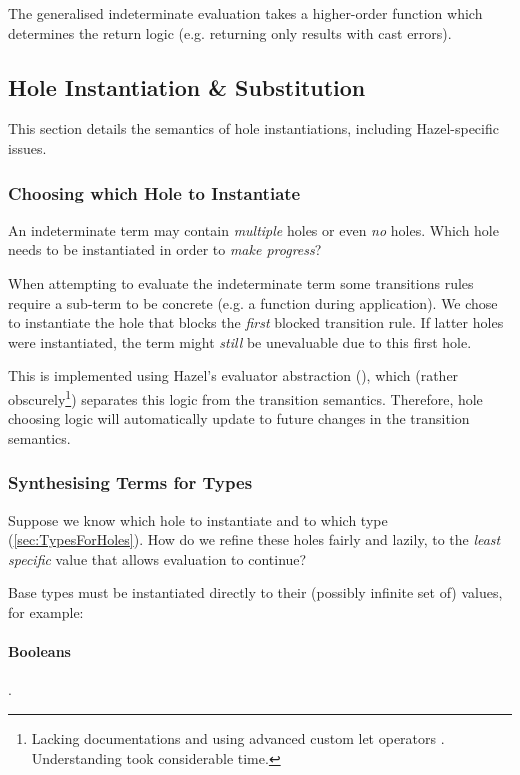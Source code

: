 The generalised indeterminate evaluation takes a higher-order  function which determines the return logic (e.g. returning only results with cast errors).

\subsection{Hole Instantiation \& Substitution}\label{sec:HoleInstantiation}
This section details the semantics of hole instantiations, including Hazel-specific issues.

\subsubsection{Choosing which Hole to Instantiate}
\label{sec:ChooseHole}
An indeterminate term may contain \textit{multiple} holes or even \textit{no} holes. Which hole needs to be instantiated in order to \textit{make progress}?

When attempting to evaluate the indeterminate term some transitions rules require a sub-term to be concrete (e.g. a function during application). We chose to instantiate the hole that blocks the \textit{first} blocked transition rule. If latter holes were instantiated, the term might \textit{still} be unevaluable due to this first hole.

This is implemented using Hazel's evaluator abstraction (), which (rather obscurely\footnote{Lacking documentations and using advanced custom let operators \cite{CustomLetOperators}. Understanding took considerable time.}) separates this logic from the transition semantics. Therefore, hole choosing logic will automatically update to future changes in the transition semantics.

\subsubsection{Synthesising Terms for Types}
Suppose we know which hole to instantiate and to which type (\cref{sec:TypesForHoles}). How do we refine these holes fairly and lazily, to the \textit{least specific} value that allows evaluation to continue?

Base types must be instantiated directly to their (possibly infinite set of) values, for example:
\paragraph{Booleans} .
